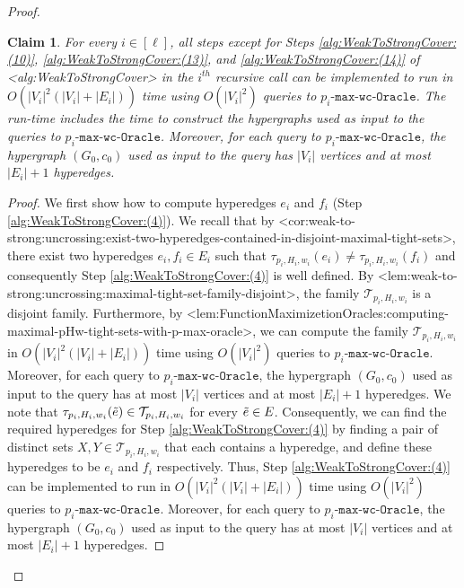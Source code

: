 \documentclass{article}
\def\Cref#1{<#1>}%
\newtheorem{claim}{Claim}[section]
\newcommand{\functionMaximizationOracle}[1]{\ensuremath{{#1}\text{-}\mathtt{max}\text{-}\mathtt{wc}\text{-}\mathtt{Oracle}}\xspace}
\newcommand{\maximalTightSetFamily}[1]{\ensuremath{\calT_{#1}}\xspace}
\newcommand{\maximalTightSetContainingHyperedge}[1]{\ensuremath{\tau_{#1}}\xspace}
\providecommand{\calT}{\mathcal{T}}
\begin{document}
\begin{proof}
\begin{claim}\label{claim:weak-to-strong-runtime-of-one-recursive-call}
For every $i\in [\ell]$, all steps except for Steps \ref{alg:WeakToStrongCover:(10)},  \ref{alg:WeakToStrongCover:(13)}, and  \ref{alg:WeakToStrongCover:(14)} of \Cref{alg:WeakToStrongCover} in the $i^{th}$ recursive call can be implemented to run in 
$O(|V_i|^2(|V_i| + |E_i|))$ time
using 
$O(|V_i|^2)$ queries to \functionMaximizationOracle{p_i}. The run-time includes the time to construct the hypergraphs used as input to the queries to \functionMaximizationOracle{p_i}. Moreover, for each query to \functionMaximizationOracle{p_i}, the hypergraph $(G_0, c_0)$ used as input to the query has  $|V_i|$ vertices and at most $|E_i| + 1$ hyperedges.
\end{claim}
\begin{proof}
We first show how to compute hyperedges $e_i$ and $f_i$ (Step \ref{alg:WeakToStrongCover:(4)}). We recall that by \Cref{cor:weak-to-strong:uncrossing:exist-two-hyperedges-contained-in-disjoint-maximal-tight-sets}, there exist two hyperedges $e_i, f_i \in E_i$ such that $\maximalTightSetContainingHyperedge{p_i, H_i, w_i}(e_i) \not = \maximalTightSetContainingHyperedge{p_i, H_i, w_i}(f_i)$ and consequently Step \ref{alg:WeakToStrongCover:(4)} is well defined. By \Cref{lem:weak-to-strong:uncrossing:maximal-tight-set-family-disjoint}, the family $\maximalTightSetFamily{p_i, H_i, w_i}$ is a disjoint family. 
Furthermore,  by \Cref{lem:FunctionMaximizetionOracles:computing-maximal-pHw-tight-sets-with-p-max-oracle}, we can compute the family $\maximalTightSetFamily{p_i, H_i, w_i}$ in $O(|V_i|^2(|V_i|+|E_i|))$ time using $O(|V_i|^2)$ queries to \functionMaximizationOracle{p_i}. 
Moreover, for each query to \functionMaximizationOracle{p_i}, the hypergraph $(G_0, c_0)$ used as input to the query has at most $|V_i|$ vertices and at most $|E_i|+1$ hyperedges. 
We note that $\maximalTightSetContainingHyperedge{p_i, H_i, w_i}(\Tilde{e}) \in \maximalTightSetFamily{p_i, H_i, w_i}$ for every $\Tilde{e} \in E$.
Consequently, we can find the required hyperedges for Step \ref{alg:WeakToStrongCover:(4)} by finding a pair of distinct sets $X, Y \in \maximalTightSetFamily{p_i, H_i, w_i}$ that each contains a hyperedge, and define these hyperedges to be $e_i$ and $f_i$ respectively. Thus, Step  \ref{alg:WeakToStrongCover:(4)} can be implemented to run in $O(|V_i|^2(|V_i|+|E_i|))$ time using $O(|V_i|^2)$ queries to \functionMaximizationOracle{p_i}. Moreover, for each query to \functionMaximizationOracle{p_i}, the hypergraph $(G_0, c_0)$ used as input to the query has at most $|V_i|$ vertices and at most $|E_i|+1$ hyperedges. 


\end{proof}
\end{proof}
\end{document}
